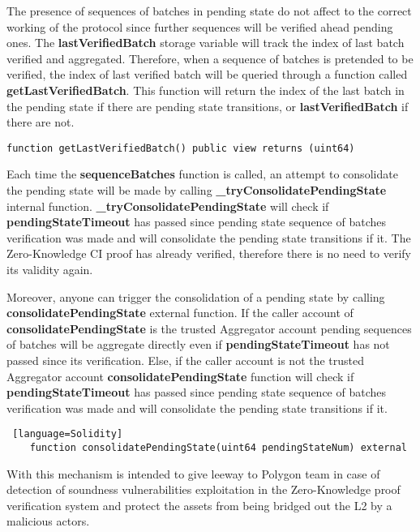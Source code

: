The presence of sequences of batches in pending state do not affect to the correct working of the protocol since further sequences will be verified ahead pending ones. The \textbf{lastVerifiedBatch} storage variable will track the index of last batch verified and aggregated. Therefore, when a sequence of batches is pretended to be verified, the index of last verified batch will be queried through a function called \textbf{getLastVerifiedBatch}. This function will return the index of the last batch in the pending state if there are pending state transitions, or \textbf{lastVerifiedBatch} if there are not.

\begin{lstlisting}[language=Solidity]
	 function getLastVerifiedBatch() public view returns (uint64)
\end{lstlisting}

Each time the \textbf{sequenceBatches} function is called, an attempt to consolidate the pending state will be made  by calling \textbf{\_tryConsolidatePendingState} internal function. \textbf{\_tryConsolidatePendingState} will check if \textbf{pendingStateTimeout} has passed since pending state sequence of batches verification was made and will consolidate the pending state transitions if it. The Zero-Knowledge CI proof has already verified, therefore there is no need to verify its validity again.

Moreover, anyone can trigger the consolidation of a pending state by calling \textbf{consolidatePendingState} external function. If the caller account of \textbf{consolidatePendingState} is the trusted Aggregator account pending sequences of batches will be aggregate directly even if \textbf{pendingStateTimeout} has not passed since its verification. Else, if the caller account is not the trusted Aggregator account \textbf{consolidatePendingState} function will check if \textbf{pendingStateTimeout} has passed since pending state sequence of batches verification was made and will consolidate the pending state transitions if it.

\begin{lstlisting} [language=Solidity]
	function consolidatePendingState(uint64 pendingStateNum) external
\end{lstlisting}

With this mechanism is intended to give leeway to Polygon team in case of detection of soundness vulnerabilities exploitation in the Zero-Knowledge proof verification system and protect the assets from being bridged out the L2 by a malicious actors.




